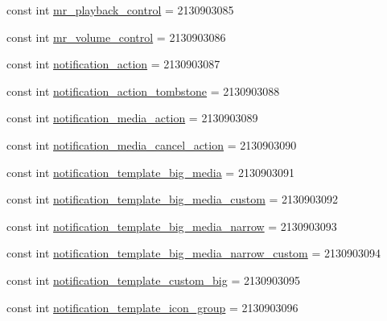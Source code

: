\begin{DoxyCompactItemize}
\item 
const int \mbox{\hyperlink{class_f_w_p_s___app_1_1_droid_1_1_resource_1_1_layout_aa91752fecc0ecd5471db7a84ebfc5e61}{mr\+\_\+playback\+\_\+control}} = 2130903085
\item 
const int \mbox{\hyperlink{class_f_w_p_s___app_1_1_droid_1_1_resource_1_1_layout_a246fe59a14fcbb9e69b1231f9db9ba38}{mr\+\_\+volume\+\_\+control}} = 2130903086
\item 
const int \mbox{\hyperlink{class_f_w_p_s___app_1_1_droid_1_1_resource_1_1_layout_a3a65750174760203cf28716300236b12}{notification\+\_\+action}} = 2130903087
\item 
const int \mbox{\hyperlink{class_f_w_p_s___app_1_1_droid_1_1_resource_1_1_layout_af64d0edee6669a5d3710af5533e2abc1}{notification\+\_\+action\+\_\+tombstone}} = 2130903088
\item 
const int \mbox{\hyperlink{class_f_w_p_s___app_1_1_droid_1_1_resource_1_1_layout_a97eddbee5939ebc310d1ba916979b343}{notification\+\_\+media\+\_\+action}} = 2130903089
\item 
const int \mbox{\hyperlink{class_f_w_p_s___app_1_1_droid_1_1_resource_1_1_layout_a770cd6e38767f281a0aef8cbc1ff5fc2}{notification\+\_\+media\+\_\+cancel\+\_\+action}} = 2130903090
\item 
const int \mbox{\hyperlink{class_f_w_p_s___app_1_1_droid_1_1_resource_1_1_layout_a0fbda80c4b9b37a3c4d7223a06e95b2d}{notification\+\_\+template\+\_\+big\+\_\+media}} = 2130903091
\item 
const int \mbox{\hyperlink{class_f_w_p_s___app_1_1_droid_1_1_resource_1_1_layout_a396fad99b511355cffcf93768051e7f4}{notification\+\_\+template\+\_\+big\+\_\+media\+\_\+custom}} = 2130903092
\item 
const int \mbox{\hyperlink{class_f_w_p_s___app_1_1_droid_1_1_resource_1_1_layout_aad475f925aea294c151d40661a1c6dec}{notification\+\_\+template\+\_\+big\+\_\+media\+\_\+narrow}} = 2130903093
\item 
const int \mbox{\hyperlink{class_f_w_p_s___app_1_1_droid_1_1_resource_1_1_layout_a2f1fc3892b9faa11d9eeb75df1f983c8}{notification\+\_\+template\+\_\+big\+\_\+media\+\_\+narrow\+\_\+custom}} = 2130903094
\item 
const int \mbox{\hyperlink{class_f_w_p_s___app_1_1_droid_1_1_resource_1_1_layout_ad86bb5fb153d1b6fa3560c2d6a9313e4}{notification\+\_\+template\+\_\+custom\+\_\+big}} = 2130903095
\item 
const int \mbox{\hyperlink{class_f_w_p_s___app_1_1_droid_1_1_resource_1_1_layout_a319fd458b3b1833e2c00197af23e72ae}{notification\+\_\+template\+\_\+icon\+\_\+group}} = 2130903096

\end{DoxyCompactItemize}
